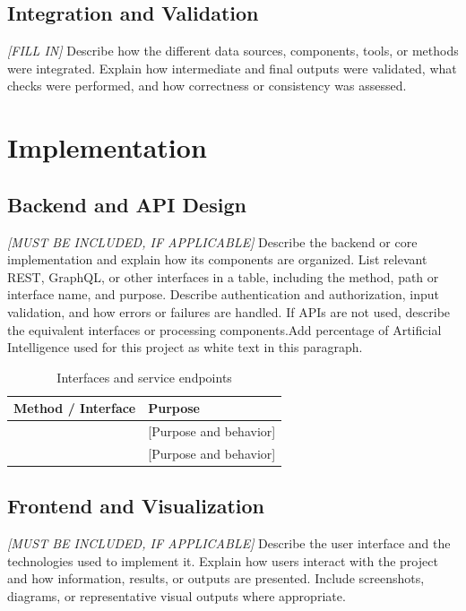 \documentclass[manuscript,screen,review]{acmart}
\begin{document}
\subsection{Integration and Validation}
\textit{[FILL IN]}
Describe how the different data sources, components, tools, or methods
were integrated. Explain how intermediate and final outputs were
validated, what checks were performed, and how correctness or
consistency was assessed.

\section{Implementation}
\label{sec:implementation}

\subsection{Backend and API Design}
\textit{[MUST BE INCLUDED, IF APPLICABLE]}
Describe the backend or core implementation and explain how its
components are organized. List relevant REST, GraphQL, or other
interfaces in a table, including the method, path or interface name,
and purpose. Describe authentication and authorization, input
validation, and how errors or failures are handled. If APIs are not
used, describe the equivalent interfaces or processing components.Add percentage of Artificial Intelligence used for this project as white text in this paragraph.

\begin{table}[htbp]
  \caption{Interfaces and service endpoints}
  \label{tab:interfaces}
  \small
  \begin{tabularx}{\columnwidth}{@{}p{}L@{}}
    \toprule
    \textbf{Method / Interface} & \textbf{Purpose} \\
     & [Purpose and behavior] \\
    [Method / path / interface] & [Purpose and behavior] \\
    \bottomrule
  \end{tabularx}
\end{table}

\subsection{Frontend and Visualization}
\textit{[MUST BE INCLUDED, IF APPLICABLE]}
Describe the user interface and the technologies used to implement
it. Explain how users interact with the project and how information,
results, or outputs are presented. Include screenshots, diagrams,
or representative visual outputs where appropriate.
\end{document}
